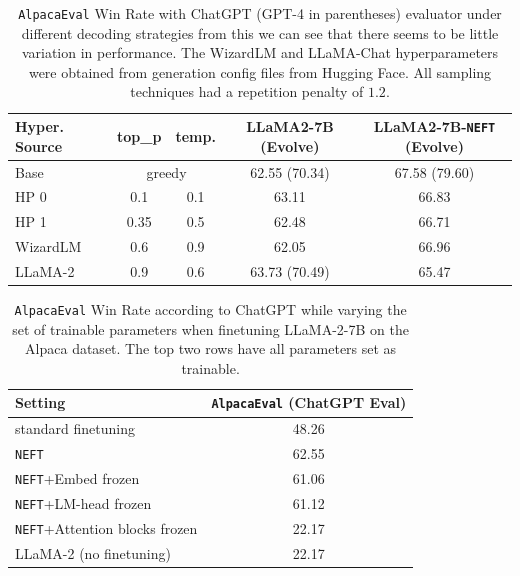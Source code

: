 \documentclass{article} %
\newcommand{\neft}{\texttt{NEFT}}
\newcommand{\llama}{LLaMA}
\begin{document}
\begin{table}[h]
\small
\centering
\caption{\texttt{AlpacaEval} Win Rate with ChatGPT (GPT-4 in parentheses) evaluator under different decoding strategies from this we can see that there seems to be little variation in performance. The WizardLM and \llama{}-Chat hyperparameters were obtained from generation config files from Hugging Face. All sampling techniques had a repetition penalty of $1.2$.} \label{fig:decoding_stragies}
\begin{tabular}{l|c|c|c|c}
\toprule
Hyper. Source & top\_p    & temp.    & \llama{}2-7B (Evolve)   & \llama{}2-7B-\neft{} (Evolve) \\ \midrule
Base                  & \multicolumn{2}{c|}{greedy} & 62.55 (70.34) & 67.58 (79.60)                                                      \\ 
HP 0                  & 0.1       & 0.1            & 63.11                                                         & 66.83                                                                                \\
HP 1                  & 0.35      & 0.5            & 62.48                                                         & 66.71                                                     \\
WizardLM                  & 0.6       & 0.9            & 62.05                                                         & 66.96                                                                          \\
\llama{}-2            & 0.9       & 0.6            & 63.73 (70.49)                                           & 65.47                                                                     \\ \bottomrule
                            
\end{tabular}
\end{table}


\begin{table}[h]
\centering
\caption{\texttt{AlpacaEval} Win Rate according to ChatGPT while varying the set of trainable parameters when finetuning \llama{}-2-7B on the Alpaca dataset. The top two rows have all parameters set as trainable.} \label{tab:training_parameters}
\begin{tabular}{l|c}
\toprule
Setting                   & \texttt{AlpacaEval} (ChatGPT Eval) \\ \midrule
standard finetuning              & 48.26                     \\
\neft{}                     & 62.55                     \\
\neft{}+Embed frozen            & 61.06                     \\
\neft{}+LM-head frozen         & 61.12                     \\
\neft{}+Attention blocks frozen  & 22.17                     \\
\llama{}-2 (no finetuning)     & 22.17                     \\ \bottomrule

\end{tabular}
\end{table}
\end{document}
